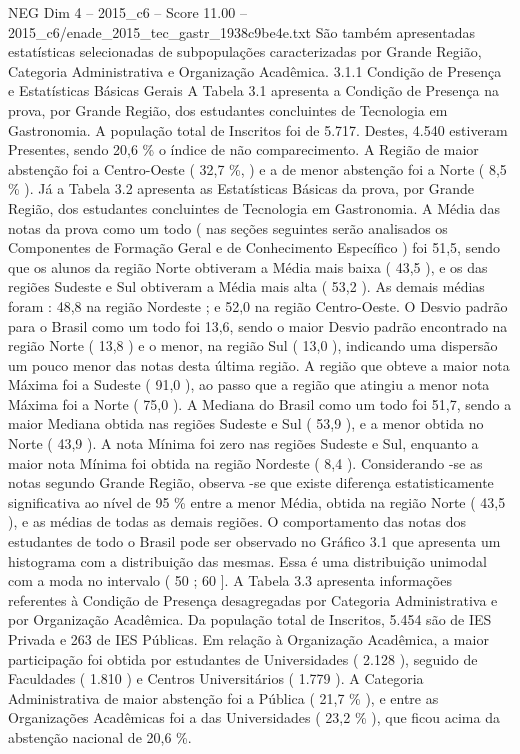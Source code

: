 \begin{textsample}{NEG Dim 4 – 2015\_c6 – Score 11.00 – 2015\_c6/enade\_2015\_tec\_gastr\_1938c9be4e.txt}
São também apresentadas estatísticas selecionadas de subpopulações caracterizadas por Grande Região, Categoria Administrativa e Organização Acadêmica. 3.1.1 Condição de Presença e Estatísticas Básicas Gerais A Tabela 3.1 apresenta a Condição de Presença na prova, por Grande Região, dos estudantes concluintes de Tecnologia em Gastronomia.
A população total de Inscritos foi de 5.717.
Destes, 4.540 estiveram Presentes, sendo 20,6 \% o índice de não comparecimento.
A Região de maior abstenção foi a Centro-Oeste ( 32,7 \%, ) e a de menor abstenção foi a Norte ( 8,5 \% ).
Já a Tabela 3.2 apresenta as Estatísticas Básicas da prova, por Grande Região, dos estudantes concluintes de Tecnologia em Gastronomia.
A Média das notas da prova como um todo ( nas seções seguintes serão analisados os Componentes de Formação Geral e de Conhecimento Específico ) foi 51,5, sendo que os alunos da região Norte obtiveram a Média mais baixa ( 43,5 ), e os das regiões Sudeste e Sul obtiveram a Média mais alta ( 53,2 ).
As demais médias foram : 48,8 na região Nordeste ; e 52,0 na região Centro-Oeste.
O Desvio padrão para o Brasil como um todo foi 13,6, sendo o maior Desvio padrão encontrado na região Norte ( 13,8 ) e o menor, na região Sul ( 13,0 ), indicando uma dispersão um pouco menor das notas desta última região.
A região que obteve a maior nota Máxima foi a Sudeste ( 91,0 ), ao passo que a região que atingiu a menor nota Máxima foi a Norte ( 75,0 ).
A Mediana do Brasil como um todo foi 51,7, sendo a maior Mediana obtida nas regiões Sudeste e Sul ( 53,9 ), e a menor obtida no Norte ( 43,9 ).
A nota Mínima foi zero nas regiões Sudeste e Sul, enquanto a maior nota Mínima foi obtida na região Nordeste ( 8,4 ).
Considerando -se as notas segundo Grande Região, observa -se que existe diferença estatisticamente significativa ao nível de 95 \% entre a menor Média, obtida na região Norte ( 43,5 ), e as médias de todas as demais regiões.
O comportamento das notas dos estudantes de todo o Brasil pode ser observado no Gráfico 3.1 que apresenta um histograma com a distribuição das mesmas.
Essa é uma distribuição unimodal com a moda no intervalo ( 50 ; 60 ].
A Tabela 3.3 apresenta informações referentes à Condição de Presença desagregadas por Categoria Administrativa e por Organização Acadêmica.
Da população total de Inscritos, 5.454 são de IES Privada e 263 de IES Públicas.
Em relação à Organização Acadêmica, a maior participação foi obtida por estudantes de Universidades ( 2.128 ), seguido de Faculdades ( 1.810 ) e Centros Universitários ( 1.779 ).
A Categoria Administrativa de maior abstenção foi a Pública ( 21,7 \% ), e entre as Organizações Acadêmicas foi a das Universidades ( 23,2 \% ), que ficou acima da abstenção nacional de 20,6 \%.

\end{textsample}
